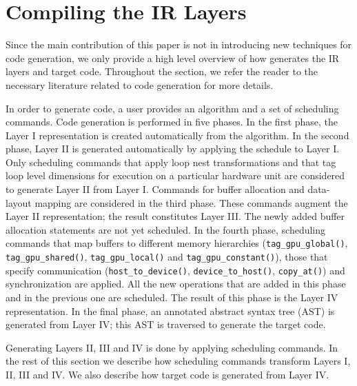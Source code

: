 \vspace{-0.25cm}
\section{Compiling the \framework{} IR Layers}

Since the main contribution of this paper is not in introducing new techniques for code generation, we only provide a high level overview of how \framework{} generates the IR layers and target code.  Throughout the section, we refer the reader to the necessary literature related to code generation for more details.

In order to generate code, a \framework{} user provides an algorithm and a set of scheduling commands.  Code generation is performed in five phases.  In the first phase, the Layer I representation is created automatically from the algorithm.
In the second phase, Layer II is generated automatically by applying the schedule to Layer I.  Only scheduling commands that apply loop nest transformations and that tag loop level dimensions for execution on a particular hardware unit are considered to generate Layer II from Layer I.
Commands for buffer allocation and data-layout mapping are considered in the third phase.  These commands augment the Layer II representation; the result constitutes Layer III.  The newly added buffer allocation statements are not yet scheduled.  In the fourth phase, scheduling commands that map buffers to different memory hierarchies (\texttt{tag\_gpu\_global()}, \texttt{tag\_gpu\_shared()}, \texttt{tag\_gpu\_local()} and \texttt{tag\_gpu\_constant()}), those that specify communication (\texttt{host\_to\_device()}, \texttt{device\_to\_host()}, \texttt{copy\_at()}) and synchronization are applied.  All the new operations that are added in this phase and in the previous one are scheduled.  The result of this phase is the Layer IV representation.  In the final phase, an annotated abstract syntax tree (AST) is generated from Layer IV; this AST is traversed to generate the target code.



Generating Layers II, III and IV is done by applying \framework{} scheduling commands.
In the rest of this section we describe how scheduling commands transform Layers I, II, III and IV.   We also describe how target code is generated from Layer IV.

\vspace{-0.25cm}
